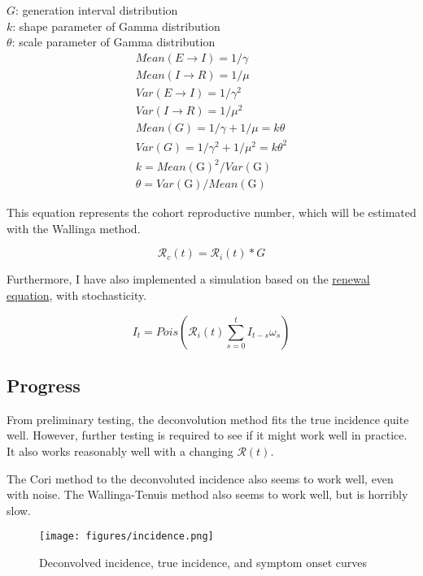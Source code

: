 \documentclass{article}
\begin{document}
$G$: generation interval distribution \\
$k$: shape parameter of Gamma distribution\\
$\theta$: scale parameter of Gamma distribution\\

\begin{align}
    Mean(E \xrightarrow{}I) = 1/\gamma \\ 
    Mean(I \xrightarrow{}R) = 1/\mu \\ 
    Var(E \xrightarrow{}I) = 1/\gamma^2 \\ 
    Var(I \xrightarrow{}R) = 1/\mu^2 \\
    Mean(G) = 1/\gamma + 1/\mu = k\theta\\ 
    Var(G) = 1/\gamma^2 + 1/\mu^2 = k\theta^2 \\ 
    k =  Mean(\text{G})^2/Var(\text{G}) \\
    \theta = Var(\text{G})/Mean(\text{G})
\end{align}

This equation represents the cohort reproductive number, which will be estimated with the Wallinga method.

\begin{equation}
    \mathscr{R}_{c}(t) = \mathscr{R}_{i}(t) * G
\end{equation}

Furthermore, I have also implemented a simulation based on the  \href{https://www.ncbi.nlm.nih.gov/pmc/articles/PMC5871640/}{renewal equation}, with stochasticity.

\begin{equation}
    I_t = Pois(\mathscr{R}_{i}(t) \sum_{s=0}^t I_{t-s} \omega_s)
\end{equation}

\subsection{Progress}
From preliminary testing, the deconvolution method fits the true incidence quite well. However, further testing is required to see if it might work well in practice. It also works reasonably well with a changing $\mathscr{R}(t)$. 

The Cori method to the deconvoluted incidence also seems to work well, even with noise. The Wallinga-Tenuis method also seems to work well, but is horribly slow.

\begin{figure}[h!]
    \centering
    \texttt{[image: figures/incidence.png]}
    \caption{Deconvolved incidence, true incidence, and symptom onset curves}
    \label{fig:my_label}
\end{figure}
\end{document}
